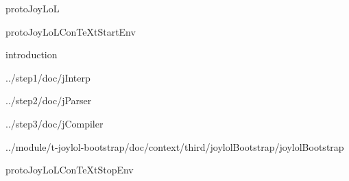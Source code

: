 
\usemodule[t-diSimp]

\startDiSimpComponent protoJoyLoL

\diSimpEnvironment protoJoyLoLConTeXtStartEnv

\diSimpComponent introduction

\diSimpComponent ../step1/doc/jInterp

\diSimpComponent ../step2/doc/jParser

\diSimpComponent ../step3/doc/jCompiler

\diSimpComponent ../module/t-joylol-bootstrap/doc/context/third/joylolBootstrap/joylolBootstrap

\diSimpEnvironment protoJoyLoLConTeXtStopEnv

\stopDiSimpComponent
